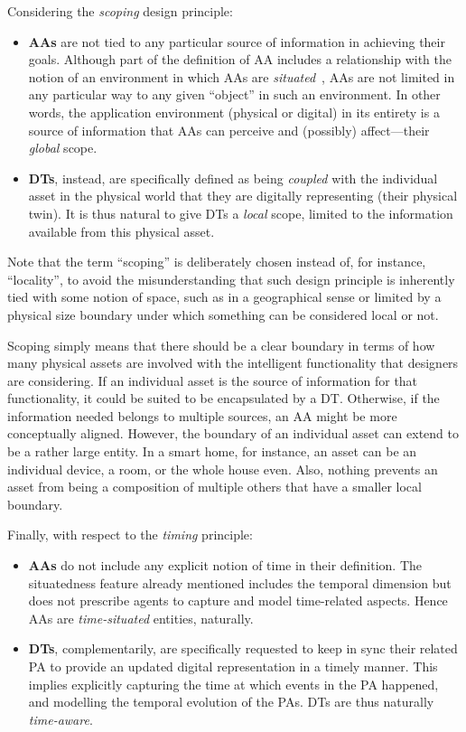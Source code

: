 Considering the \emph{scoping} design principle:
\begin{itemize}
\item \textbf{AAs} are not tied to any particular source of information in achieving their goals. 
Although part of the definition of AA includes a relationship with the notion of an environment in which AAs are \emph{situated}~\cite{wooldridge1995ker}, AAs are not limited in any particular way to any given ``object'' in such an environment. 
In other words, the application environment (physical or digital) in its entirety is a source of information that AAs can perceive and (possibly) affect---their \emph{global} scope. 

\item \textbf{DTs}, instead, are specifically defined as being \emph{coupled} with the individual asset in the physical world that they are digitally representing (their physical twin). 
It is thus natural to give DTs a \emph{local} scope, limited to the information available from this physical asset. 
\end{itemize}
Note that the term ``scoping'' is deliberately chosen instead of, for instance, ``locality'', to avoid the misunderstanding that such design principle is inherently tied with some notion of space, such as in a geographical sense or limited by a physical size boundary under which something can be considered local or not.

Scoping simply means that there should be a clear boundary in terms of how many physical assets are involved with the intelligent functionality that designers are considering. 
If an individual asset is the source of information for that functionality, it could be suited to be encapsulated by a DT. 
Otherwise, if the information needed belongs to multiple sources, an AA might be more conceptually aligned.
%
However, the boundary of an individual asset can extend to be a rather large entity.
%
In a smart home, for instance, an asset can be an individual device, a room, or the whole house even. 
Also, nothing prevents an asset from being a composition of multiple others that have a smaller local boundary. 

Finally, with respect to the \emph{timing} principle:
\begin{itemize}
\item \textbf{AAs} do not include any explicit notion of time in their definition. 
    The situatedness feature already mentioned includes the temporal dimension but does not prescribe agents to capture and model time-related aspects. 
    Hence AAs are \emph{time-situated} entities, naturally. 
\item \textbf{DTs}, complementarily, are specifically requested to keep in sync %
    their related PA to provide an updated digital representation in a timely manner. 
    This implies explicitly capturing the time at which events in the PA happened, and modelling the temporal evolution of the PAs. %
    DTs are thus naturally \emph{time-aware}. 
\end{itemize}

